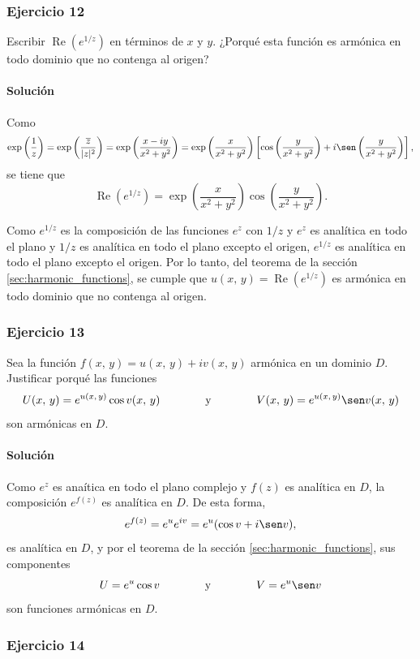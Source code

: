\documentclass[a4paper]{report}
\renewcommand{\Re}{\operatorname{Re}}
\begin{document}
\subsubsection{Ejercicio 12}

Escribir \(\Re(e^{1/z})\) en términos de \(x\) y \(y\). ¿Porqué esta función es armónica en todo dominio que no contenga al origen?

\paragraph{Solución} Como
\[
 \exp\left(\frac{1}{z}\right)=\exp\left(\frac{\overline{z}}{|z|^2}\right)
 =\exp\left(\frac{x-iy}{x^2+y^2}\right)
 =\exp\left(\frac{x}{x^2+y^2}\right)\left[\cos\left(\frac{y}{x^2+y^2}\right)+i\sen\left(\frac{y}{x^2+y^2}\right)\right],
\]
se tiene que 
\[
 \Re(e^{1/z})=\exp\left(\frac{x}{x^2+y^2}\right)\cos\left(\frac{y}{x^2+y^2}\right).
\]

Como \(e^{1/z}\) es la composición de las funciones \(e^z\) con \(1/z\) y \(e^z\) es analítica en todo el plano y \(1/z\) es analítica en todo el plano excepto el origen, \(e^{1/z}\) es analítica en todo el plano excepto el origen. Por lo tanto, del teorema de la sección \ref{sec:harmonic_functions}, se cumple que \(u(x,\,y)=\Re(e^{1/z})\) es armónica en todo dominio que no contenga al origen.

\subsubsection{Ejercicio 13}

Sea la función \(f(x,\,y)=u(x,\,y)+iv(x,\,y)\) armónica en un dominio \(D\). Justificar porqué las funciones
\[
 U(x,\,y)=e^{u(x,\,y)}\cos v(x,\,y)
 \qquad\qquad\textrm{y}\qquad\qquad
 V(x,\,y)=e^{u(x,\,y)}\sen v(x,\,y)
\]
son armónicas en \(D\).

\paragraph{Solución} Como \(e^z\) es anaítica en todo el plano complejo y \(f(z)\) es analítica en \(D\), la composición \(e^{f(z)}\) es analítica en \(D\). De esta forma,
\[
 e^{f(z)}=e^ue^{iv}=e^u(\cos v+i\sen v),
\]
es analítica en \(D\), y por el teorema de la sección \ref{sec:harmonic_functions}, sus componentes
\[
 U=e^u\cos v
 \qquad\qquad\textrm{y}\qquad\qquad
 V=e^u\sen v
\]
son funciones armónicas en \(D\). 

\subsubsection{Ejercicio 14}
\end{document}
